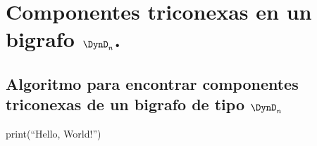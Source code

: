 \chapter{Componentes triconexas en un bigrafo $\DynD_{n}$.}

\section{Algoritmo para encontrar componentes triconexas de un bigrafo de tipo $\DynD_{n}$}

\begin{pyverbatim} 
print(“Hello, World!”) 
\end{pyverbatim} 
